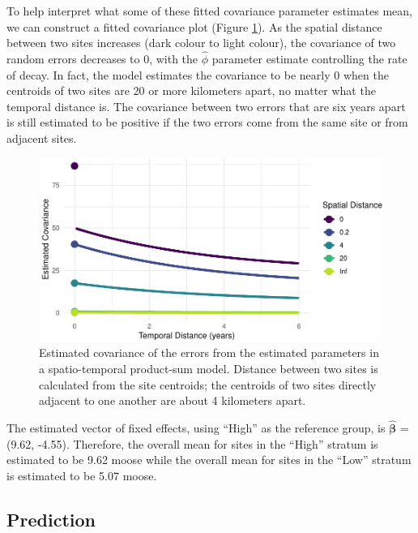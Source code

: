 \documentclass[]{article}    %
\begin{document}
To help interpret what some of these fitted covariance parameter
estimates mean, we can construct a fitted covariance plot (Figure
\ref{fig:covplot}). As the spatial distance between two sites increases
(dark colour to light colour), the covariance of two random errors
decreases to 0, with the \(\hat{\phi}\) parameter estimate controlling
the rate of decay. In fact, the model estimates the covariance to be
nearly 0 when the centroids of two sites are 20 or more kilometers
apart, no matter what the temporal distance is. The covariance between
two errors that are six years apart is still estimated to be positive if
the two errors come from the same site or from adjacent sites.

\begin{figure}
\centering
\includegraphics{covplot-1.pdf}
\caption{\label{fig:covplot} Estimated covariance of the errors from the
estimated parameters in a spatio-temporal product-sum model. Distance
between two sites is calculated from the site centroids; the centroids
of two sites directly adjacent to one another are about 4 kilometers
apart.}
\end{figure}

The estimated vector of fixed effects, using ``High'' as the reference
group, is \(\bm{\hat{\beta}}\) = (9.62, -4.55). Therefore, the overall
mean for sites in the ``High'' stratum is estimated to be 9.62 moose
while the overall mean for sites in the ``Low'' stratum is estimated to
be 5.07 moose.

\hypertarget{prediction}{%
\subsection{Prediction}\label{prediction}}
\end{document}
